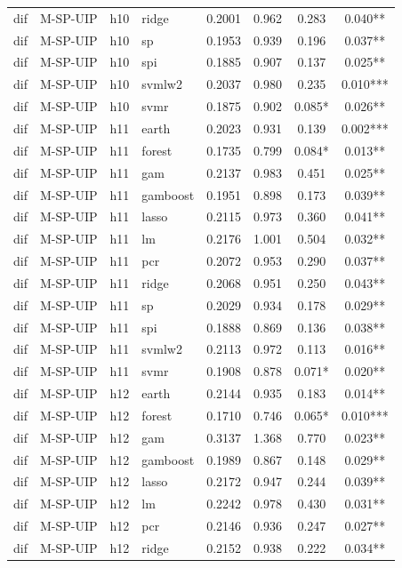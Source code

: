 \begin{ThreePartTable}
\begin{longtable}[t]{llclcccc}
dif & M-SP-UIP & h10 & ridge & 0.2001 & 0.962 & 0.283 & 0.040**\\
dif & M-SP-UIP & h10 & sp & 0.1953 & 0.939 & 0.196 & 0.037**\\
dif & M-SP-UIP & h10 & spi & 0.1885 & 0.907 & 0.137 & 0.025**\\
dif & M-SP-UIP & h10 & svmlw2 & 0.2037 & 0.980 & 0.235 & 0.010***\\
dif & M-SP-UIP & h10 & svmr & 0.1875 & 0.902 & 0.085* & 0.026**\\
\addlinespace
dif & M-SP-UIP & h11 & earth & 0.2023 & 0.931 & 0.139 & 0.002***\\
dif & M-SP-UIP & h11 & forest & 0.1735 & 0.799 & 0.084* & 0.013**\\
dif & M-SP-UIP & h11 & gam & 0.2137 & 0.983 & 0.451 & 0.025**\\
dif & M-SP-UIP & h11 & gamboost & 0.1951 & 0.898 & 0.173 & 0.039**\\
dif & M-SP-UIP & h11 & lasso & 0.2115 & 0.973 & 0.360 & 0.041**\\
dif & M-SP-UIP & h11 & lm & 0.2176 & 1.001 & 0.504 & 0.032**\\
dif & M-SP-UIP & h11 & pcr & 0.2072 & 0.953 & 0.290 & 0.037**\\
dif & M-SP-UIP & h11 & ridge & 0.2068 & 0.951 & 0.250 & 0.043**\\
dif & M-SP-UIP & h11 & sp & 0.2029 & 0.934 & 0.178 & 0.029**\\
dif & M-SP-UIP & h11 & spi & 0.1888 & 0.869 & 0.136 & 0.038**\\
dif & M-SP-UIP & h11 & svmlw2 & 0.2113 & 0.972 & 0.113 & 0.016**\\
dif & M-SP-UIP & h11 & svmr & 0.1908 & 0.878 & 0.071* & 0.020**\\
\addlinespace
dif & M-SP-UIP & h12 & earth & 0.2144 & 0.935 & 0.183 & 0.014**\\
dif & M-SP-UIP & h12 & forest & 0.1710 & 0.746 & 0.065* & 0.010***\\
dif & M-SP-UIP & h12 & gam & 0.3137 & 1.368 & 0.770 & 0.023**\\
dif & M-SP-UIP & h12 & gamboost & 0.1989 & 0.867 & 0.148 & 0.029**\\
dif & M-SP-UIP & h12 & lasso & 0.2172 & 0.947 & 0.244 & 0.039**\\
dif & M-SP-UIP & h12 & lm & 0.2242 & 0.978 & 0.430 & 0.031**\\
dif & M-SP-UIP & h12 & pcr & 0.2146 & 0.936 & 0.247 & 0.027**\\
dif & M-SP-UIP & h12 & ridge & 0.2152 & 0.938 & 0.222 & 0.034**\\

\end{longtable}
\end{ThreePartTable}

